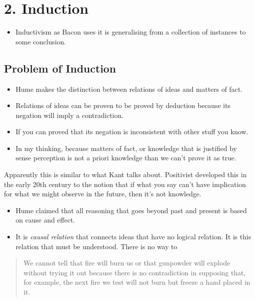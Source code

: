 \documentclass[11pt]{article}
\begin{document}
\hypertarget{induction}{%
\section{2. Induction}\label{induction}}

\begin{itemize}
\tightlist
\item
  Inductivism as Bacon uses it is generalising from a collection of
  instances to some conclusion.
\end{itemize}

\hypertarget{problem-of-induction}{%
\subsection{Problem of Induction}\label{problem-of-induction}}

\begin{itemize}
\tightlist
\item
  Hume makes the distinction between relations of ideas and matters of
  fact.
\item
  Relations of ideas can be proven to be proved by deduction because its
  negation will imply a contradiction.
\item
  If you can proved that its negation is inconsistent with other stuff
  you know.
\item
  In my thinking, because matters of fact, or knowledge that is
  justified by sense perception is not a priori knowledge than we can't
  prove it as true.
\end{itemize}

Apparently this is similar to what Kant talks about. Positivist
developed this in the early 20th century to the notion that if what you
say can't have implication for what we might observe in the future, then
it's not knowledge.

\begin{itemize}
\tightlist
\item
  Hume claimed that all reasoning that goes beyond past and present is
  based on cause and effect.
\item
  It is \emph{causal relation} that connects ideas that have no logical
  relation. It is this relation that must be understood. There is no way
  to
\end{itemize}

\begin{quote}
We cannot tell that fire will burn us or that gunpowder will explode
without trying it out because there is no contradiction in supposing
that, for example, the next fire we test will not burn but freeze a hand
placed in it.
\end{quote}
\end{document}
